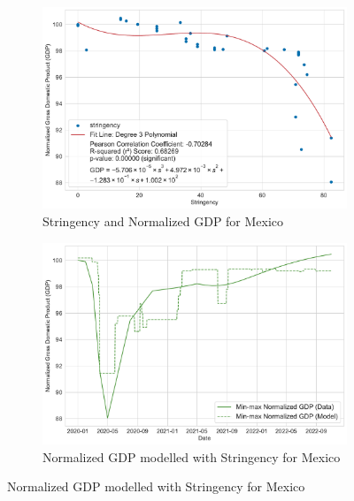 \documentclass[tikz,fleqn,12pt]{wlscirep}
\begin{document}
\begin{figure}[htbp!]
  \begin{subfigure}[t]{0.48\textwidth}
    \centering
    \includegraphics[width=\linewidth]{images/stringency_vs_gdp_MEX.pdf}
    \caption{Stringency and Normalized GDP for Mexico}
  \end{subfigure}
  \label{fig:stringency_vs_gdp_MEX}
  \hfill
  \begin{subfigure}[t]{0.48\textwidth}
    \centering
    \includegraphics[width=\linewidth]{images/gdp_modelled_with_stringency_MEX.pdf}
    \caption{Normalized GDP modelled with Stringency for Mexico}
  \end{subfigure}
  \label{fig:gdp_modelled_with_stringency_MEX}


\end{figure}
\end{document}
